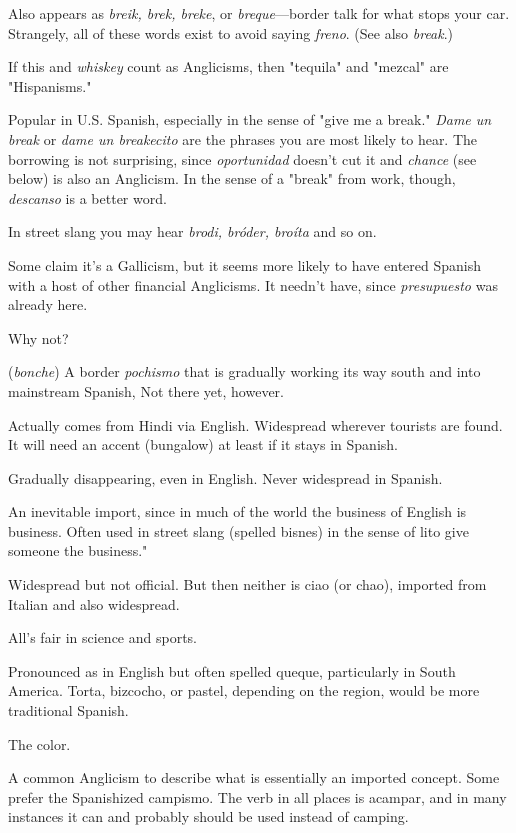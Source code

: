  Also appears as \emph{breik, brek, breke}, or \emph{breque}---border talk for what stops your car. Strangely, all of these words exist to
avoid saying \emph{freno}. (See also \emph{break}.)

 If this and \emph{whiskey} count as Anglicisms, then "tequila" and "mezcal" are "Hispanisms."

 Popular in U.S. Spanish, especially in the sense of "give
me a break." \emph{Dame un break} or \emph{dame un breakecito} are the phrases
you are most likely to hear. The borrowing is not surprising, since
\emph{oportunidad} doesn't cut it and \emph{chance} (see below) is also an Anglicism.
In the sense of a "break" from work, though, \emph{descanso} is a better word.

 In street slang you may hear \emph{brodi, bróder, broíta}
and so on.

 Some claim it's a Gallicism, but it seems more
likely to have entered Spanish with a host of other financial Anglicisms. It needn't have, since \emph{presupuesto} was already here.

 Why not?

 (\emph{bonche}) A border \emph{pochismo} that is gradually
working its way south and into mainstream Spanish, Not there yet,
however.

 Actually comes from Hindi via English. Widespread wherever tourists are found. It will need an accent (bungalow)
at least if it stays in Spanish.

 Gradually disappearing, even in English. Never widespread in Spanish.

 An inevitable import, since in much of the world
the business of English is business. Often used in street slang (spelled
bisnes) in the sense of lito give someone the business."

 Widespread but not official. But then neither is ciao (or
chao), imported from Italian and also widespread.

 All's fair in science and sports.

 Pronounced as in English but often spelled queque,
particularly in South America. Torta, bizcocho, or pastel, depending
on the region, would be more traditional Spanish.

 The color.

 A common Anglicism to describe what is essentially an imported concept. Some prefer the Spanishized campismo.
The verb in all places is acampar, and in many instances it can and
probably should be used instead of camping.

